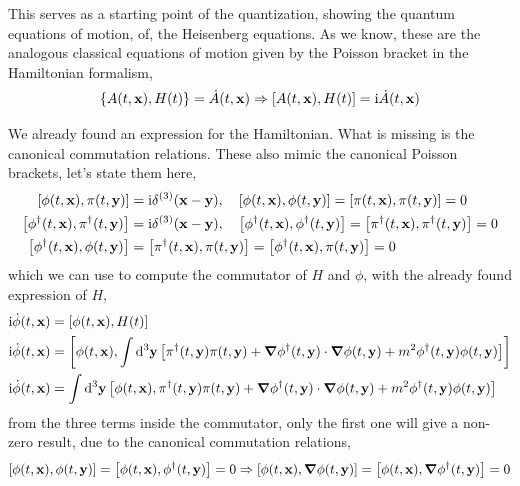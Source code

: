 \probitem{}

This serves as a starting point of the quantization, showing the quantum equations of motion, of, the Heisenberg equations. 
As we know, these are the analogous classical equations of motion given by the Poisson bracket in the Hamiltonian formalism,
\begin{align}
    \acomm{A\qty(t,\vb x)}{H\qty(t)}=\dot A\qty(t,\vb x)\Rightarrow \comm{A\qty(t,\vb x)}{ H(t)} = \im\dot A\qty(t,\vb x) 
\end{align}

We already found an expression for the Hamiltonian. What is missing is the canonical commutation relations. These also mimic the 
canonical Poisson brackets, let's state them here, 
\begin{align}
    \comm{\phi\qty(t,\vb x)}{\pi\qty(t,\vb y)}&= \im\delta^{\qty(3)}\qty(\vb x-\vb y), \ \ \ \comm{\phi\qty(t,\vb x)}{\phi\qty(t,\vb y)}=\comm{\pi\qty(t,\vb x)}{\pi\qty(t,\vb y)}=0\\
    \comm{\phi^\dagger\qty(t,\vb x)}{\pi^\dagger\qty(t,\vb y)}&= \im\delta^{\qty(3)}\qty(\vb x-\vb y), \ \ \ \comm{\phi^\dagger\qty(t,\vb x)}{\phi^\dagger\qty(t,\vb y)}=\comm{\pi^\dagger\qty(t,\vb x)}{\pi^\dagger\qty(t,\vb y)}=0\\
    \comm{\phi^\dagger\qty(t,\vb x)}{\phi\qty(t,\vb y)}&=\comm{\pi^\dagger\qty(t,\vb x)}{\pi\qty(t,\vb y)}=\comm{\phi^\dagger\qty(t,\vb x)}{\pi\qty(t,\vb y)}=0
\end{align}
which we can use to compute the commutator of $H$ and $\phi$, with the already found 
expression of $H$,
\begin{align}
    \im\dot\phi\qty(t,\vb x)&=\comm{\phi\qty(t,\vb x)}{H\qty(t)}\\
    \im\dot\phi\qty(t,\vb x)&=\comm{\phi\qty(t,\vb x)}{\int\dd[3]{\vb y}\qty[\pi^\dagger\qty(t,\vb y)\pi\qty(t,\vb y)+\grad\phi^\dagger\qty(t,\vb y)\cdot\grad\phi\qty(t,\vb y) +m^2\phi^\dagger\qty(t,\vb y)\phi\qty(t,\vb y)]}\\
    \im\dot\phi\qty(t,\vb x)&=\int\dd[3]{\vb y}\comm{\phi\qty(t,\vb x)}{\pi^\dagger\qty(t,\vb y)\pi\qty(t,\vb y)+\grad\phi^\dagger\qty(t,\vb y)\cdot\grad\phi\qty(t,\vb y) +m^2\phi^\dagger\qty(t,\vb y)\phi\qty(t,\vb y)} 
\end{align}
from the three terms inside the commutator, only the first one will give a non-zero result, 
due to the canonical commutation relations,
\begin{align}
    \comm{\phi\qty(t,\vb x)}{\phi\qty(t,\vb y)} = \comm{\phi\qty(t,\vb x)}{\phi^\dagger\qty(t,\vb y)} =0\Rightarrow \comm{\phi\qty(t,\vb x)}{\grad\phi\qty(t,\vb y)} = \comm{\phi\qty(t,\vb x)}{\grad\phi^\dagger\qty(t,\vb y)} =0
\end{align}
